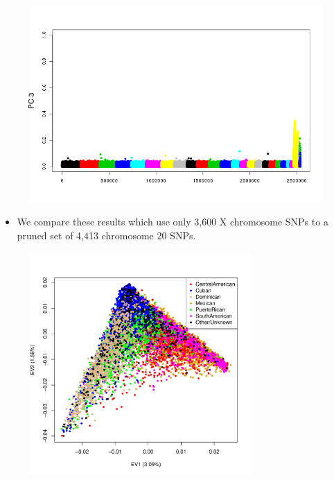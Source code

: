 \documentclass{beamer}
\begin{document}
\begin{frame}
\centering
\begin{figure}
\includegraphics[height=7.5cm]{../pca_x_corrManh_ev3.png}
\end{figure}
\end{frame}

\begin{frame}
\begin{itemize}
\item We compare these results which use only 3,600 X chromosome SNPs to a pruned set of 4,413 chromosome 20 SNPs.
\end{itemize}
\end{frame}


\begin{frame}
\centering
\begin{figure}
\includegraphics[height=8.5cm]{../pca_chr20_ev12_col.pdf}
\end{figure}
\end{frame}
\end{document}
